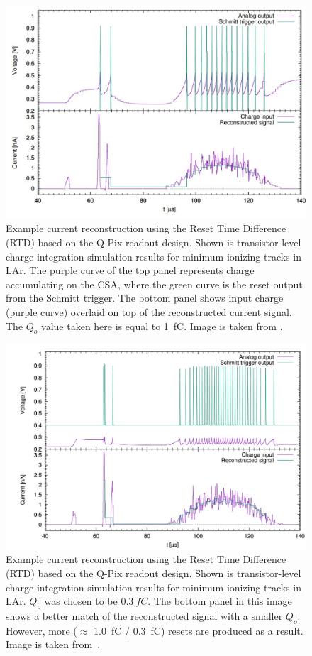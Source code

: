 \begin{figure}[]
\centering
\includegraphics[width=\textwidth]{images/qpix_rtd_reconstruction_example.jpg}
\caption{Example current reconstruction using the Reset Time Difference (RTD) based on the Q-Pix readout design. 
Shown is transistor-level charge integration simulation results for minimum ionizing tracks in LAr.
The purple curve of the top panel represents charge accumulating on the CSA, where the green curve is the reset output from the Schmitt trigger.
The bottom panel shows input charge (purple curve) overlaid on top of the reconstructed current signal.
The $Q_{o}$ value taken here is equal to 1~\unit{fC}.
Image is taken from \citep{qpix:nygren:mei}.}
\label{fig:qpixRecon1}
\end{figure}

\begin{figure}[]
\centering
\includegraphics[width=\textwidth]{images/qpix_rtd_reconstruction_example_03fc.jpg}
\caption{Example current reconstruction using the Reset Time Difference (RTD) based on the Q-Pix readout design.
Shown is transistor-level charge integration simulation results for minimum ionizing tracks in LAr.
$Q_{o}$ was chosen to be $0.3~\unit{fC}$.
The bottom panel in this image shows a better match of the reconstructed signal with a smaller $Q_{o}$. 
However, more ($\approx$ 1.0~\unit{fC} / 0.3~\unit{fC}) resets are produced as a result. 
Image is taken from~\citep{qpix:nygren:mei}.}
\label{fig:qpixRecon2}
\end{figure}

